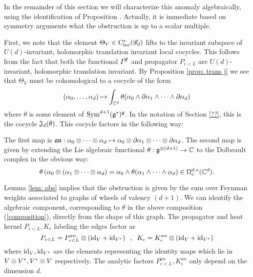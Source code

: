 In the remainder of this section we will characterize this anomaly algebraically, using the identification of Proposition \cite{prop: trans j}. 
Actually, it is immediate based on symmetry arguments what the obstruction is up to a scalar multiple. 

First, we note that the element $\Theta_V \in {\rm C}_{\rm loc}^*(\mathscr G_d)$ lifts to the invariant subspace of $U(d)$-invariant, holomorphic translation invariant local cocycles.
This follows from the fact that both the functional $I^{\mathscr G}$ and propagator $P_{\epsilon<L}$ are $U(d)$-invariant, holomorphic translation invariant.
By Proposition \ref{prop: trans j} we see that $\Theta_V$ must be cohomological to a cocycle of the form
\[
(\alpha_0, \ldots, \alpha_d) \mapsto \int_{\mathbb C^d} \theta(\alpha_0 \wedge \partial \alpha_1 \wedge \cdots \wedge \partial \alpha_d) 
\]
where $\theta$ is some element of ${\rm Sym}^{d+1}(\mathfrak g^*)^\mathfrak g$.
In the notation of Section \ref{??}, this is the cocycle $\mathfrak J_d (\theta)$. 
This cocycle factors in the following way:
\beqn\label{composition}
\eeqn
The first map is $\mathfrak a \mathfrak n : \alpha_0 \otimes \cdots \otimes \alpha_d \mapsto \alpha_0 \otimes \partial \alpha_1 \otimes \cdots \otimes \partial \alpha_d$.
The second map is given by extending the Lie algebraic functional $\theta : \mathfrak g^{\otimes (d+1)} \to \mathbb C$ to the Dolbeault complex in the obvious way:
\[
\theta \left(\alpha_0 \otimes (\alpha_1 \otimes \cdots \otimes \alpha_d\right) = \alpha_0 \wedge \theta(\alpha_1 \wedge \cdots \wedge \alpha_d) \in \Omega^{d,*}_c(\mathbb C^d).
\]

Lemma \ref{lem: obs} implies that the obstruction is given by the sum over Feynman weights associated to graphs of wheels of valency $(d+1)$.
We can identify the algebraic component, corresponding to $\theta$ in the above composition (\ref{composition}), directly from the shape of this graph. 
The propagator and heat kernel $P_{\epsilon<L}, K_\epsilon$ labeling the edges factor as
\[
P_{\epsilon<L} = P^{an}_{\epsilon<L} \otimes \left({\rm id}_{V} + {\rm id}_{V^*}\right) \;\; , \;\; K_{\epsilon} = K_{\epsilon}^{an} \otimes \left({\rm id}_{V} + {\rm id}_{V^*}\right)
\]
where ${\rm id}_V, {\rm id}_{V^*}$ are the elements representing the identity maps which lie in $V \otimes V^*, V^* \otimes V$ respectively. 
The analytic factors $P^{an}_{\epsilon<L},  K_{\epsilon}^{an}$ only depend on the dimension $d$. 

